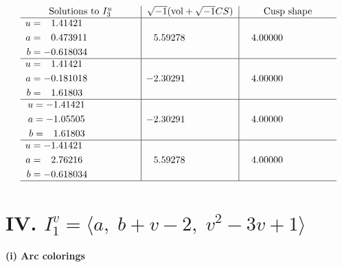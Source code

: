 \documentclass[1p]{elsarticle_modified}
\theoremstyle{definition}
\newcommand{\I}{\sqrt{-1}}
\begin{document}
$$\begin{array}{c|c|c}  
\text{Solutions to }I^u_{3}& \I (\text{vol} + \sqrt{-1}CS) & \text{Cusp shape}\\
 \hline 
\begin{aligned}
u &= \phantom{-}1.41421\phantom{ +0.000000I} \\
a &= \phantom{-}0.473911\phantom{ +0.000000I} \\
b &= -0.618034\phantom{ +0.000000I}\end{aligned}
 & \phantom{-}5.59278\phantom{ +0.000000I} & \phantom{-}4.00000\phantom{ +0.000000I} \\ \hline\begin{aligned}
u &= \phantom{-}1.41421\phantom{ +0.000000I} \\
a &= -0.181018\phantom{ +0.000000I} \\
b &= \phantom{-}1.61803\phantom{ +0.000000I}\end{aligned}
 & -2.30291\phantom{ +0.000000I} & \phantom{-}4.00000\phantom{ +0.000000I} \\ \hline\begin{aligned}
u &= -1.41421\phantom{ +0.000000I} \\
a &= -1.05505\phantom{ +0.000000I} \\
b &= \phantom{-}1.61803\phantom{ +0.000000I}\end{aligned}
 & -2.30291\phantom{ +0.000000I} & \phantom{-}4.00000\phantom{ +0.000000I} \\ \hline\begin{aligned}
u &= -1.41421\phantom{ +0.000000I} \\
a &= \phantom{-}2.76216\phantom{ +0.000000I} \\
b &= -0.618034\phantom{ +0.000000I}\end{aligned}
 & \phantom{-}5.59278\phantom{ +0.000000I} & \phantom{-}4.00000\phantom{ +0.000000I}\\
 \hline 
 \end{array}$$\newpage\newpage\renewcommand{\arraystretch}{1}
\centering \section*{IV. $I^v_{1}= \langle a,\;b+v-2,\;v^2-3 v+1 \rangle$}
\flushleft \textbf{(i) Arc colorings}\\
\end{document}
